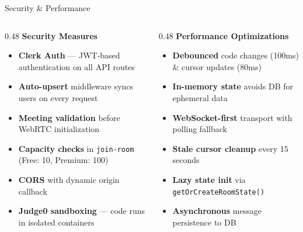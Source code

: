 \documentclass[aspectratio=169, 12pt]{beamer}
\begin{document}
\begin{frame}{Security \& Performance}
  \vspace{0.3em}
  \begin{columns}[T]
    \begin{column}{0.48\textwidth}
      {\small\bfseries\color{MeetPrimary} Security Measures}
      \vspace{0.5em}
      \begin{itemize}\setlength{\itemsep}{0.5em}
        \item \textbf{Clerk Auth} --- JWT-based authentication on all API routes
        \item \textbf{Auto-upsert} middleware syncs users on every request
        \item \textbf{Meeting validation} before WebRTC initialization
        \item \textbf{Capacity checks} in \texttt{join-room} (Free: 10, Premium: 100)
        \item \textbf{CORS} with dynamic origin callback
        \item \textbf{Judge0 sandboxing} --- code runs in isolated containers
      \end{itemize}
    \end{column}

    \begin{column}{0.48\textwidth}
      {\small\bfseries\color{MeetGreen} Performance Optimizations}
      \vspace{0.5em}
      \begin{itemize}\setlength{\itemsep}{0.5em}
        \item \textbf{Debounced} code changes (100ms) \& cursor updates (80ms)
        \item \textbf{In-memory state} avoids DB for ephemeral data
        \item \textbf{WebSocket-first} transport with polling fallback
        \item \textbf{Stale cursor cleanup} every 15 seconds
        \item \textbf{Lazy state init} via \texttt{getOrCreateRoomState()}
        \item \textbf{Asynchronous} message persistence to DB
      \end{itemize}
    \end{column}
  \end{columns}
\end{frame}
\end{document}

